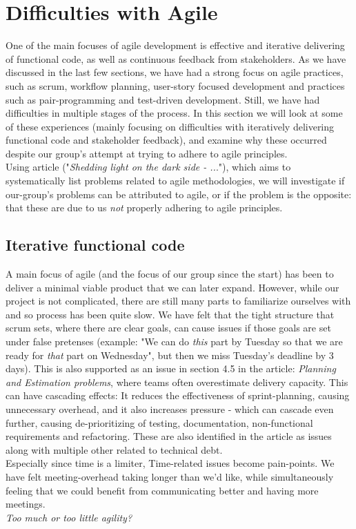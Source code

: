 \section{Difficulties with Agile}
One of the main focuses of agile development is effective and iterative delivering of functional code, as well as continuous feedback from stakeholders. As we have discussed in the last few sections, we have had a strong focus on agile practices, such as scrum, workflow planning, user-story focused development and practices such as pair-programming and test-driven development. Still, we have had difficulties in multiple stages of the process. In this section we will look at some of these experiences (mainly focusing on difficulties with iteratively delivering functional code and stakeholder feedback), and examine why these occurred despite our group's attempt at trying to adhere to agile principles.
\vspace{5mm}\\
Using article \cite{DarkSide} ("\textit{Shedding light on the dark side - ..}."), which aims to systematically list problems related to agile methodologies, we will  investigate if our-group's problems can be attributed to agile, or if the problem is the opposite: that these are due to us \textit{not} properly adhering to agile principles.

\subsection{Iterative functional code}
A main focus of agile (and the focus of our group since the start) has been to deliver a minimal viable product that we can later expand. However, while our project is not complicated, there are still many parts to familiarize ourselves with and so process has been quite slow. We have felt that the tight structure that scrum sets, where there are clear goals, can cause issues if those goals are set under false pretenses (example: "We can do \textit{this} part by Tuesday so that we are ready for \textit{that} part on Wednesday", but then we miss Tuesday's deadline by 3 days). This is also supported as an issue in section 4.5 in the article: \textit{Planning and Estimation problems}, where teams often overestimate delivery capacity. This can have cascading effects: It reduces the effectiveness of sprint-planning, causing unnecessary overhead, and it also increases pressure - which can cascade even further, causing de-prioritizing of testing, documentation, non-functional requirements and refactoring. These are also identified in the article as issues along with multiple other related to technical debt.
\vspace{5mm}\\
Especially since time is a limiter, Time-related issues become pain-points. We have felt meeting-overhead taking longer than we'd like, while simultaneously feeling that we could benefit from communicating better and having more meetings.
\vspace{5mm}\\
\textit{Too much or too little agility?}


